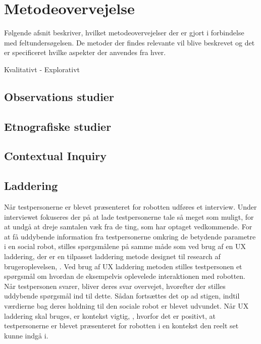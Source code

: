 \section{Metodeovervejelse}
\label{ParametreMetodeovervejelser}
%
Følgende afsnit beskriver, hvilket metodeovervejelser der er gjort i forbindelse med feltundersøgelsen. De metoder der findes relevante vil blive beskrevet og det er specificeret hvilke aspekter der anvendes fra hver. \blankline
%

Kvalitativt - Explorativt 
% 

\subsection{Observations studier}
\label{ParametreObservationsStudier}

\subsection{Etnografiske studier}
\label{ParametreEtnografiskeStudier}

\subsection{Contextual Inquiry}
\label{ParametreContextualInquiry}

\subsection{Laddering}
\label{ParametreLaddering}
%
Når testpersonerne er blevet præsenteret for robotten udføres et interview. Under interviewet fokuseres der på at lade testpersonerne tale så meget som muligt, for at undgå at dreje samtalen væk fra de ting, som har optaget vedkommende. For at få uddybende information fra testpersonerne omkring de betydende parametre i en social robot, stilles spørgsmålene på samme måde som ved brug af en UX laddering, der er en tilpasset laddering metode designet til research af brugeroplevelsen, \parencite[ss. 3-4]{PDF:LadderingTheUserExperience}. Ved brug af UX laddering metoden stilles testpersonen et spørgsmål om hvordan de eksempelvis oplevelede interaktionen med robotten. Når testpersonen svarer, bliver deres svar overvejet, hvorefter der stilles uddybende spørgsmål ind til dette. Sådan fortsættes det op ad stigen, indtil værdierne bag deres holdning til den sociale robot er blevet udvundet. Når UX laddering skal bruges, er kontekst vigtig, \parencite[s. 3]{PDF:LadderingTheUserExperience}, hvorfor det er positivt, at testpersonerne er blevet præsenteret for robotten i en kontekst den reelt set kunne indgå i. 

